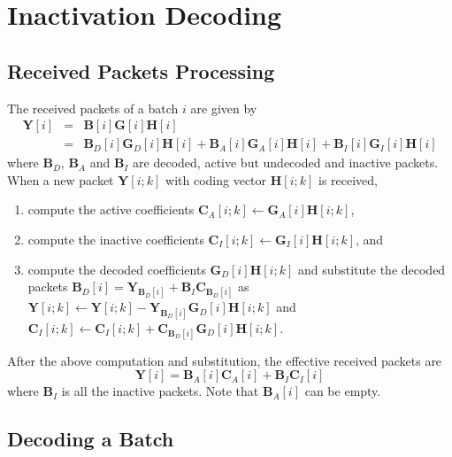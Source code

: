 \documentclass{report}
\begin{document}
\section{Inactivation Decoding}
\label{sec:inact}

\subsection{Received Packets Processing}

The received packets of a batch $i$ are given by
\begin{eqnarray*}
  \mathbf{Y}[i] 
  & = & \mathbf{B} [i] \mathbf{G}[i] \mathbf{H}[i] \\
  & = & \mathbf{B}_D [i] \mathbf{G}_D[i]\mathbf{H}[i] + \mathbf{B}_A [i] \mathbf{G}_A[i]\mathbf{H}[i] + \mathbf{B}_I [i] \mathbf{G}_I[i] \mathbf{H}[i]
\end{eqnarray*}
where $\mathbf{B}_D$, $\mathbf{B}_A$ and $\mathbf{B}_I$ are decoded,
active but undecoded and inactive packets. When a new packet
$\mathbf{Y}[i;k]$ with coding vector $\mathbf{H}[i;k]$ is received,
\begin{enumerate}
\item compute the active coefficients $\mathbf{C}_A[i;k]\leftarrow \mathbf{G}_A[i]\mathbf{H}[i;k]$,
\item compute the inactive coefficients $\mathbf{C}_I[i;k]\leftarrow \mathbf{G}_I[i]\mathbf{H}[i;k]$, and
\item compute the decoded coefficients $\mathbf{G}_D[i]\mathbf{H}[i;k]$ and substitute the decoded packets $\mathbf{B}_D [i] = \mathbf{Y}_{\mathbf{B}_D [i]} + \mathbf{B}_I \mathbf{C}_{\mathbf{B}_D [i]}$ as $\mathbf{Y}[i;k] \leftarrow \mathbf{Y}[i;k] - \mathbf{Y}_{\mathbf{B}_D [i]}\mathbf{G}_D[i]\mathbf{H}[i;k]$ and $\mathbf{C}_I[i;k] \leftarrow \mathbf{C}_I[i;k] + \mathbf{C}_{\mathbf{B}_D [i]}\mathbf{G}_D[i]\mathbf{H}[i;k]$.
\end{enumerate}


After the above computation and substitution, the effective received
packets are
\begin{equation*}
  \mathbf{Y}[i] = \mathbf{B}_A [i] \mathbf{C}_A[i] + \mathbf{B}_I \mathbf{C}_I[i]
\end{equation*}
where $\mathbf{B}_I$ is all the inactive packets.
Note that $\mathbf{B}_A[i]$ can be empty.


\subsection{Decoding a Batch}
\end{document}
